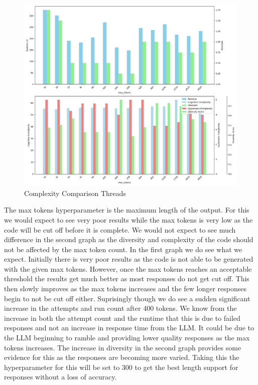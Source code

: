 \documentclass[12pt]{extarticle}
\begin{document}
\begin{figure}[h!]
\centering
\includegraphics[width=0.8\linewidth]{Images/Hyperparam_max_tokens_Comparison.png}
\caption{Complexity Comparison Threads}
\label{fig:Complexity_Comparison_Threads}
\end{figure}

The max tokens hyperparameter is the maximum length of the output. For this we would expect to see very poor results while the max tokens is very low as the code will be cut off before it is complete. We would not expect to see much difference in the second graph as the diversity and complexity of the code should not be affected by the max token count. In the first graph we do see what we expect. Initially there is very poor results as the code is not able to be generated with the given max tokens. However, once the max tokens reaches an acceptable threshold the results get much better as most responses do not get cut off. This then slowly improves as the max tokens increases and the few longer responses begin to not be cut off either. Suprisingly though we do see a sudden significant increase in the attempts and run count after 400 tokens. We know from the increase in both the attempt count and the runtime that this is due to failed responses and not an increase in response time from the LLM. It could be due to the LLM beginning to ramble and providing lower quality responses as the max tokens increases. The increase in diversity in the second graph provides some evidence for this as the responses are becoming more varied. Taking this the hyperparameter for this will be set to 300 to get the best length support for responses without a loss of accuracy.
\end{document}
